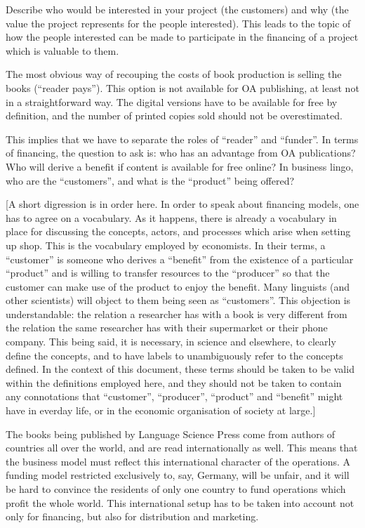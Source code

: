 \documentclass[output=guidelines,nonflat,smallfont,
draftmode
]{langsci/langscibook}
\newcommand{\background}[1]{ 
  \vspace{5mm}
  \renewcommand{\tblslinecolour}{lsDarkBlue}
  \tblssy[red]{explore2}{Background}{\vspace*{-5mm}#1}
}
\newcommand{\langscisolution}[1]{
  \renewcommand{\tblslinecolour}{lsLightBlue}
  \tblssy{langsci}{LangSci solution}{\vspace*{-5mm}#1}
}
\renewcommand{\tblssy}[4][black!12]{%
  \renewcommand{\langscisymbol}{#2}\renewcommand{\tblsboxcolor}{#1}
  \begin{mdframed}[style=yellowexercise,frametitle={#3}]
    #4
  \end{mdframed}
}
\begin{document}
\background{Describe who would be interested in your project (the customers) and why (the value the project represents for the people interested). This leads to the topic of how the people interested can be made to participate in the financing of a project which is valuable to them. 
}
\langscisolution{
The most obvious way of recouping the costs of book production is selling the books (``reader pays''). This option is not available for OA publishing, at least not in a straightforward way. The digital versions have to be available for free by definition, and the number of printed copies sold should not be overestimated. 

This implies that we have to separate the roles of ``reader'' and ``funder''. In terms of financing, the question to ask is: who has an advantage from OA publications? Who will derive a benefit if content is available for free online? In business lingo, who are the ``customers'', and what is the ``product'' being offered? 

[A short digression is in order here. In order to speak about financing models, one has to agree on a vocabulary. As it happens, there is already a vocabulary in place for discussing the concepts, actors, and processes which arise when setting up shop. This is the vocabulary employed by economists. In their terms, a ``customer'' is someone who derives a ``benefit'' from the existence of a particular ``product'' and is willing to transfer resources to the ``producer'' so that the customer can make use of the product to enjoy the benefit. Many linguists (and other scientists) will object to them being seen as ``customers''. This objection is understandable: the relation a researcher has with a book is very different from the relation the same researcher has with their supermarket or their phone company. This being said, it is necessary, in science and elsewhere, to clearly define the concepts, and to have labels to unambiguously refer to the concepts defined. In the context of this document, these terms  should be taken to be valid within the definitions employed here, and they should not be taken to contain any connotations that ``customer'', ``producer'', ``product'' and ``benefit'' might have in everday life, or in the economic organisation of society at large.]

The books being published by Language Science Press come from authors of countries all over the world, and are read internationally as well. This means that the business model must reflect this international character of the operations. A funding model restricted exclusively to, say, Germany, will be unfair, and it will be hard to convince the residents of only one country to fund operations which profit the whole world. This international setup has to be taken into account not only for financing, but also for distribution and marketing. 
 
}
\end{document}
